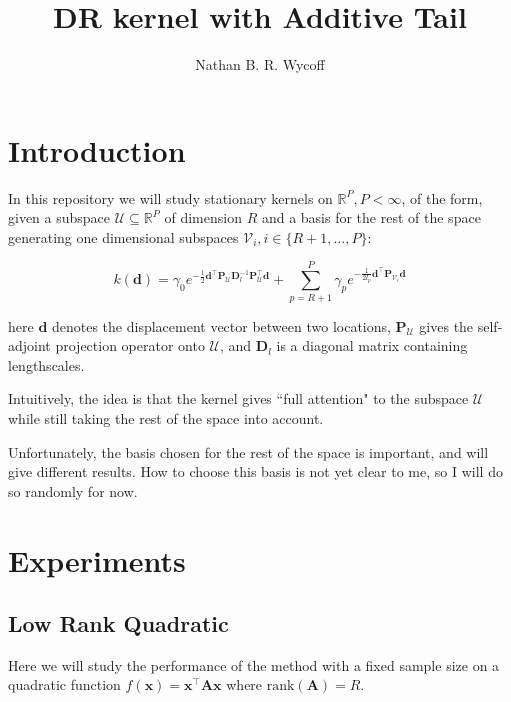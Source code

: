 \documentclass[a4paper]{article}
\title
{DR kernel with Additive Tail}
\author{Nathan B. R. Wycoff}
\begin{document}
\maketitle

\section{Introduction}

In this repository we will study stationary kernels on $\mathbb{R}^P, P < \infty$, of the form, given a subspace $\mathcal{U} \subseteq \mathbb{R}^P$ of dimension $R$ and a basis for the rest of the space generating one dimensional subspaces $\mathcal{V}_i, i \in \{R+1, \ldots, P\}$:

\begin{equation}
	k(\mathbf{d}) = \gamma_0 e^{-\frac{1}{2}\mathbf{d}^\top \mathbf{P}_{\mathcal{U}} \mathbf{D}_l^{-1} \mathbf{P}_{\mathcal{U}}^\top\mathbf{d}} + \sum_{p=R+1}^P \gamma_{p}e^{-\frac{1}{2l_p}\mathbf{d}^\top \mathbf{P}_{\mathcal{V}_i}\mathbf{d}}
\end{equation}

here $\mathbf{d}$ denotes the displacement vector between two locations, $\mathbf{P}_{\mathcal{U}}$ gives the self-adjoint projection operator onto $\mathcal{U}$, and $\mathbf{D}_l$ is a diagonal matrix containing lengthscales.

Intuitively, the idea is that the kernel gives ``full attention" to the subspace $\mathcal{U}$ while still taking the rest of the space into account. 

Unfortunately, the basis chosen for the rest of the space is important, and will give different results. How to choose this basis is not yet clear to me, so I will do so randomly for now.

\section{Experiments}

\subsection{Low Rank Quadratic}

Here we will study the performance of the method with a fixed sample size on a quadratic function $f(\mathbf{x}) = \mathbf{x}^\top\mathbf{A}\mathbf{x}$ where $\textrm{rank}(\mathbf{A}) = R$.
\end{document}
